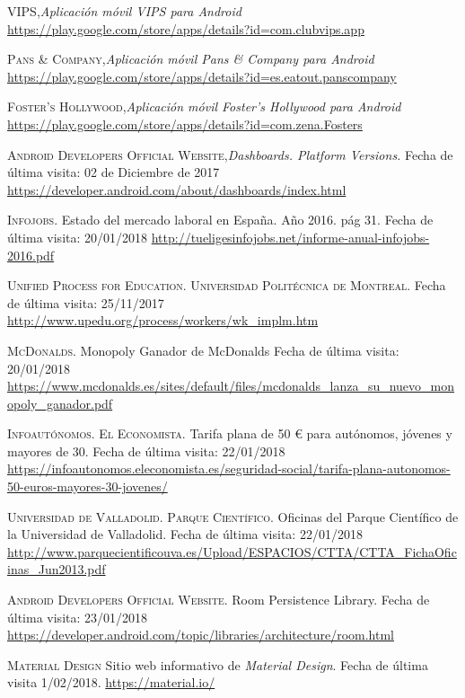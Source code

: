\documentclass[twoside]{report}
\begin{document}
\begin{thebibliography}{a}
 \textsc{VIPS},\textit{Aplicación móvil VIPS para Android} \url{https://play.google.com/store/apps/details?id=com.clubvips.app}

 \textsc{Pans \& Company},\textit{Aplicación móvil Pans \& Company para Android} \url{https://play.google.com/store/apps/details?id=es.eatout.panscompany}

 \textsc{Foster's Hollywood},\textit{Aplicación móvil Foster's Hollywood para Android} \url{https://play.google.com/store/apps/details?id=com.zena.Fosters}

 \textsc{Android Developers Official Website},\textit{Dashboards. Platform Versions.} Fecha de última visita: 02 de Diciembre de 2017 \url{https://developer.android.com/about/dashboards/index.html}

 \textsc{Infojobs}. Estado del mercado laboral en España. Año 2016. pág 31. Fecha de última visita: 20/01/2018 \url{http://tueligesinfojobs.net/informe-anual-infojobs-2016.pdf} 

 \textsc{Unified Process for Education. Universidad Politécnica de Montreal}. Fecha de última visita: 25/11/2017 \url{http://www.upedu.org/process/workers/wk_implm.htm}

 \textsc{McDonalds}. Monopoly Ganador de McDonalds Fecha de última visita: 20/01/2018 \url{https://www.mcdonalds.es/sites/default/files/mcdonalds_lanza_su_nuevo_monopoly_ganador.pdf}

 \textsc{Infoautónomos. El Economista}. Tarifa plana de 50 \euro \hspace{0.1cm} para autónomos, jóvenes y mayores de 30. Fecha de última visita: 22/01/2018 \url{https://infoautonomos.eleconomista.es/seguridad-social/tarifa-plana-autonomos-50-euros-mayores-30-jovenes/}

 \textsc{Universidad de Valladolid. Parque Científico}. Oficinas del Parque Científico de la Universidad de Valladolid. Fecha de última visita: 22/01/2018 \url{http://www.parquecientificouva.es/Upload/ESPACIOS/CTTA/CTTA_FichaOficinas_Jun2013.pdf}

 \textsc{Android Developers Official Website}. Room Persistence Library. Fecha de última visita: 23/01/2018 \url{https://developer.android.com/topic/libraries/architecture/room.html}

 \textsc{Material Design} 
Sitio web informativo de \textit{Material Design}. Fecha de última visita 1/02/2018. \url{https://material.io/}


\end{thebibliography}
\end{document}
